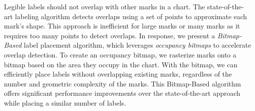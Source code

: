 Legible labels should not overlap with other marks in a chart.
The state-of-the-art labeling algorithm detects overlaps using a set of points to approximate each mark's shape.
This approach is inefficient for large marks or many marks as it requires too many points to detect overlaps.
In response, we present a \emph{Bitmap-Based} label placement algorithm, which leverages \emph{occupancy bitmaps} to accelerate overlap detection.
To create an occupancy bitmap, we rasterize marks onto a bitmap based on the area they occupy in the chart.
With the bitmap, we can efficiently place labels without overlapping existing marks,
regardless of the number and geometric complexity of the marks.
This Bitmap-Based algorithm offers significant performance improvements over the state-of-the-art approach
while placing a similar number of labels.